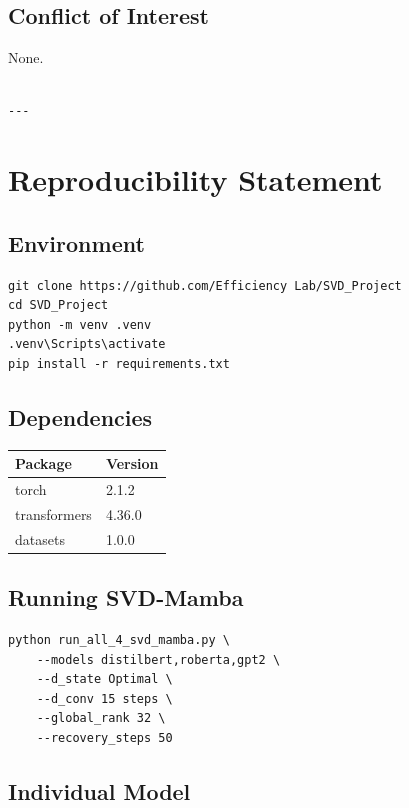 \subsection{Conflict of Interest}

None.
\begin{lstlisting}

---
\end{lstlisting}


\section{Reproducibility Statement}

\subsection{Environment}

\begin{lstlisting}
git clone https://github.com/Efficiency Lab/SVD_Project
cd SVD_Project
python -m venv .venv
.venv\Scripts\activate
pip install -r requirements.txt
\end{lstlisting}

\subsection{Dependencies}

\begin{table}[H]
\centering
\small
\begin{tabular}{ll}
\toprule
\textbf{Package} & \textbf{Version} \\
\midrule
torch & 2.1.2 \\
transformers & 4.36.0 \\
datasets & 1.0.0 \\
\bottomrule
\end{tabular}
\end{table}

\subsection{Running SVD-Mamba}

\begin{lstlisting}
python run_all_4_svd_mamba.py \
    --models distilbert,roberta,gpt2 \
    --d_state Optimal \
    --d_conv 15 steps \
    --global_rank 32 \
    --recovery_steps 50
\end{lstlisting}

\subsection{Individual Model}

